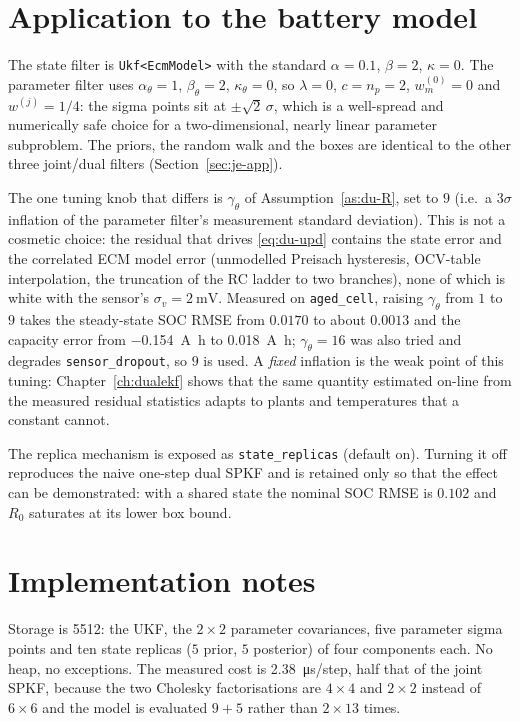 \section{Application to the battery model}
The state filter is \texttt{Ukf<EcmModel>} with the standard $\alpha=0.1$, $\beta=2$, $\kappa=0$.
The parameter filter uses $\alpha_\theta=1$, $\beta_\theta=2$, $\kappa_\theta=0$, so
$\lambda=0$, $c=n_p=2$, $w^{(0)}_m=0$ and $w^{(j)}=1/4$: the sigma points sit at
$\pm\sqrt{2}\,\sigma$, which is a well-spread and numerically safe choice for a two-dimensional,
nearly linear parameter subproblem.  The priors, the random walk and the boxes are identical to the
other three joint/dual filters (Section~\ref{sec:je-app}).

The one tuning knob that differs is $\gamma_\theta$ of Assumption~\ref{as:du-R}, set to $9$
(i.e.\ a $3\sigma$ inflation of the parameter filter's measurement standard deviation).  This is
not a cosmetic choice: the residual that drives \eqref{eq:du-upd} contains the state error and the
correlated ECM model error (unmodelled Preisach hysteresis, OCV-table interpolation, the truncation
of the RC ladder to two branches), none of which is white with the sensor's
$\sigma_v=\SI{2}{\milli\volt}$.  Measured on \texttt{aged\_cell}, raising $\gamma_\theta$ from $1$ to
$9$ takes the steady-state SOC RMSE from $0.0170$ to about $0.0013$ and the capacity error from
\SI{-0.154}{\ampere\hour} to \SI{+0.018}{\ampere\hour}; $\gamma_\theta=16$ was also tried and
degrades \texttt{sensor\_dropout}, so $9$ is used.  A \emph{fixed} inflation is the weak point of
this tuning: Chapter~\ref{ch:dualekf} shows that the same quantity estimated on-line from the
measured residual statistics adapts to plants and temperatures that a constant cannot.

The replica mechanism is exposed as \texttt{state\_replicas} (default on).  Turning it off
reproduces the naive one-step dual SPKF and is retained only so that the effect can be demonstrated:
with a shared state the nominal SOC RMSE is $0.102$ and $R_0$ saturates at its lower box bound.

\section{Implementation notes}
Storage is \SI{5512}{\byte}: the UKF, the $2\times2$ parameter covariances, five parameter sigma
points and ten state replicas ($5$ prior, $5$ posterior) of four components each.  No heap, no
exceptions.  The measured cost is \SI{2.38}{\micro\second}/step, half that of the joint SPKF,
because the two Cholesky factorisations are $4\times4$ and $2\times2$ instead of $6\times6$ and the
model is evaluated $9+5$ rather than $2\times13$ times.

